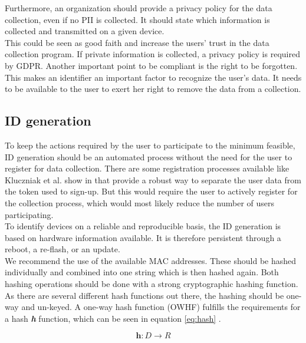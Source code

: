         Furthermore, an organization should provide a privacy policy for the data collection, even if no PII is collected. It should state which information is collected and transmitted on a given device.\\
        This could be seen as good faith and increase the users' trust in the data collection program. If private information is collected, a privacy policy is required by GDPR. Another important point to be compliant is the right to be forgotten. This makes an identifier an important factor to recognize the user's data. It needs to be available to the user to exert her right to remove the data from a collection.
        
          
    \subsection{ID generation}
        \label{subsec:software_design:id}
        To keep the actions required by the user to participate to the minimum feasible, ID generation should be an automated process without the need for the user to register for data collection. There are some registration processes available like Kluczniak et al. show in  \cite{kluczniak_anonymous_2015} that provide a robust way to separate the user data from the token used to sign-up. But this would require the user to actively register for the collection process, which would most likely reduce the number of users participating.\\
        
        To identify devices on a reliable and reproducible basis, the ID generation is based on hardware information available. It is therefore persistent through a reboot, a re-flash, or an update.\\
        We recommend the use of the available MAC addresses. These should be hashed individually and combined into one string which is then hashed again. Both hashing operations should be done with a strong cryptographic hashing function.
        As there are several different hash functions out there, the hashing should be one-way and un-keyed. A one-way hash function (OWHF) fulfills the requirements for a hash \textbf{\textit{h}} function, which can be seen in equation \ref{eq:hash} \cite{sobti_cryptographic_2012}.
        
        \begin{equation}
            \label{eq:hash}
            \textbf{h} : D \longrightarrow R
        \end{equation}
        
